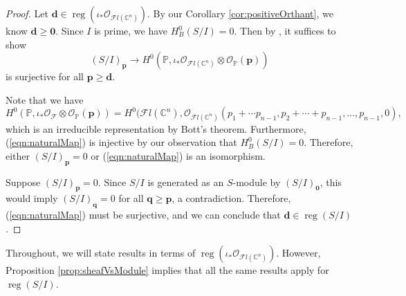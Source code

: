 \documentclass[12pt,reqno]{amsart}
\theoremstyle{definition}
\theoremstyle{remark}
\newcommand{\reg}{\operatorname{reg}}
\newcommand{\calF}{{\mathcal{F}}}
\newcommand{\calO}{{\mathcal{O}}}
\begin{document}
\begin{proof}

Let $\mathbf d \in \reg(\iota_*\calO_{\calF l(\mathbb C^n)})$.  By our Corollary \ref{cor:positiveOrthant}, we know $\mathbf d \geq \mathbf 0$.  Since $I$ is prime, we have $H^0_B(S/I) = 0$.  Then by \cite[Proposition 6.4]{MaclaganSmith2004}, it suffices to show
\begin{equation}\label{eqn:naturalMap}
    (S/I)_{\mathbf p} \rightarrow H^0(\mathbb P,\iota_*\calO_{\calF l(\mathbb C^n)}\otimes\calO_{\mathbb P}(\mathbf p))
\end{equation}
is surjective for all $\mathbf p \geq \mathbf d$.

Note that we have
\begin{equation*}
H^0(\mathbb P, \iota_*\calO_{\calF}\otimes \calO_{\mathbb P}(\mathbf p)) = H^0(\calF l(\mathbb C^n),\calO_{\calF l(\mathbb C^n)}(p_1+\cdots p_{n-1},p_2+\cdots+p_{n-1},\ldots,p_{n-1},0),
\end{equation*}
which is an irreducible representation by Bott's theorem.  Furthermore, (\ref{eqn:naturalMap}) is injective by our observation that $H^0_B(S/I) = 0$.  Therefore, either $(S/I)_{\mathbf p} = 0$ or (\ref{eqn:naturalMap}) is an isomorphism.

Suppose $(S/I)_{\mathbf p} = 0$.  Since $S/I$ is generated as an $S$-module by $(S/I)_{\mathbf 0}$, this would imply $(S/I)_{\mathbf q} = 0$ for all $\mathbf q \geq \mathbf p$, a contradiction.  Therefore,   (\ref{eqn:naturalMap}) must be surjective, and we can conclude that $\mathbf d \in \reg(S/I)$.
\end{proof}

 Throughout, we will state results in terms of $\reg(\iota_*\calO_{\calF l(\mathbb C^n)})$.  However, Proposition \ref{prop:sheafVsModule} implies that all the same results apply for $\reg(S/I)$.
\end{document}
